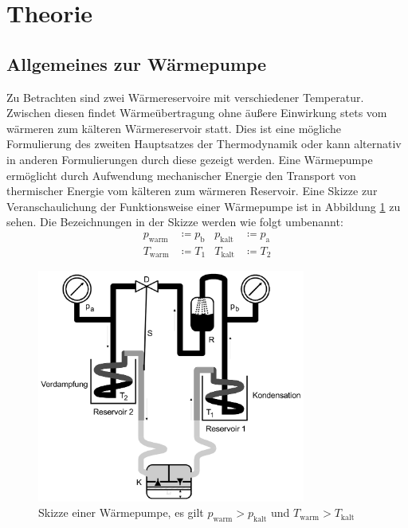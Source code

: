 \section{Theorie}
\label{sec:Theorie}
\subsection{Allgemeines zur Wärmepumpe}
Zu Betrachten sind zwei Wärmereservoire mit verschiedener Temperatur.
Zwischen diesen findet Wärmeübertragung ohne äußere Einwirkung stets vom
wärmeren zum kälteren Wärmereservoir statt. Dies ist eine mögliche Formulierung des
zweiten Hauptsatzes der Thermodynamik oder kann alternativ in anderen Formulierungen
durch diese gezeigt werden. \newline
Eine Wärmepumpe ermöglicht durch Aufwendung mechanischer Energie den Transport von
thermischer Energie vom kälteren zum wärmeren Reservoir.
Eine Skizze zur Veranschaulichung der Funktionsweise einer Wärmepumpe ist in
Abbildung \ref{fig:waermepumpebild} zu sehen. Die Bezeichnungen in der Skizze werden
wie folgt umbenannt:
\begin{align*}
p_\text{warm} &\coloneqq p_\text{b} & p_\text{kalt} &\coloneqq p_\text{a} \\
T_\text{warm} &\coloneqq T_1 & T_\text{kalt} &\coloneqq T_2
\end{align*}

\begin{figure}[H]
  \centering
  \includegraphics[width=250pt]{data/waermepumpe.png}
  \caption{Skizze einer Wärmepumpe, es gilt $p_\text{warm} > p_\text{kalt}$ und $T_\text{warm} > T_\text{kalt}$ \cite{Versuchsanleitung}}
  \label{fig:waermepumpebild}
\end{figure}

